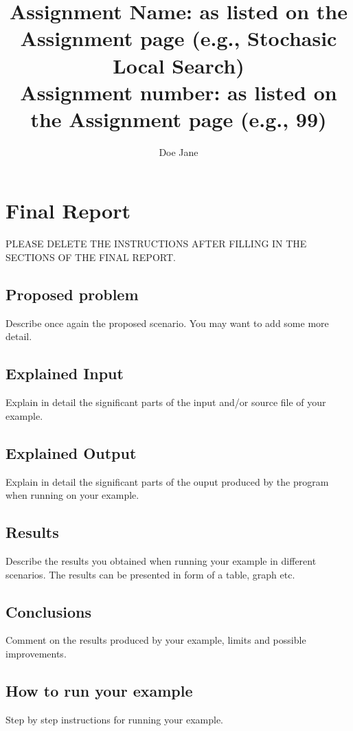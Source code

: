 \documentclass[a4paper,10pt]{report}
\title{
Assignment Name: as listed on the Assignment page (e.g., Stochasic Local Search) \\ 
Assignment number: as listed on the Assignment page (e.g., 99)
}
\author{Doe Jane}
\date{}
\begin{document}
\maketitle

\setcounter{chapter}{1}
\chapter{Final Report}

PLEASE DELETE THE INSTRUCTIONS AFTER FILLING IN THE SECTIONS OF THE FINAL REPORT.

\section{Proposed problem}
Describe once again the proposed scenario. You may want to add some more detail.

\section{Explained Input} 
 Explain in detail the significant parts of the input and/or source file of your example.

\section{Explained Output}
 Explain in detail the significant parts of the ouput produced by the program when running on your example.

\section{Results}
 Describe the results you obtained when running your example in different scenarios.
The results can be presented in form of a table, graph etc.

\section{Conclusions}
Comment on the results produced by your example, limits and possible improvements.

\section{How to run your example}
 Step by step instructions for running your example.
\end{document}

